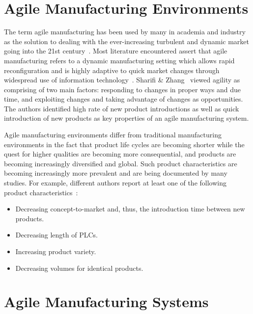 \section{Agile Manufacturing Environments}

The term agile manufacturing has been used by many in academia and industry as the solution to dealing with the ever-increasing turbulent and dynamic market going into the 21st century~\cite{CHO.CIE.1996}. Most literature encountered assert that agile manufacturing refers to a dynamic manufacturing setting which allows rapid reconfiguration and is highly adaptive to quick market changes through widespread use of information technology~\cite{Graves.1995,Xiaoyuan.1996}. Sharifi \& Zhang~\cite{SHARIFI.2001} viewed agility as comprising of two main factors: responding to changes in proper ways and due time, and exploiting changes and taking advantage of changes as opportunities. The authors identified high rate of new product introductions as well as quick introduction of new products as key properties of an agile manufacturing
system.

Agile manufacturing environments differ from traditional manufacturing environments in the fact that product life cycles are becoming shorter while the quest for higher qualities are becoming more consequential, and products are becoming increasingly diversified and global. Such product characteristics are becoming increasingly more prevalent and are being documented by many studies. For example, different authors report at least one of the following product characteristics~\cite{Sanderson.1990,Cordero.1991,Hisrich.1991,Millson.1992}:
\begin{itemize}
\item Decreasing concept-to-market and, thus, the introduction time between new products.
\item Decreasing length of PLCs.
\item Increasing product variety.
\item Decreasing volumes for identical products.
\end{itemize}

\section{Agile Manufacturing Systems}


